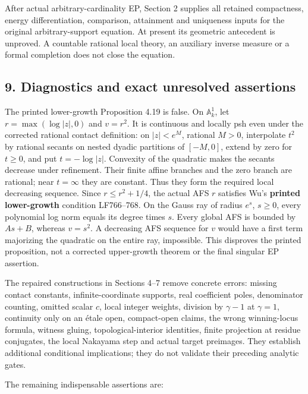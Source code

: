 \documentclass[
  10pt,
]{article}
\begin{document}
After actual arbitrary-cardinality EP, Section 2 supplies all retained
compactness, energy differentiation, comparison, attainment and
uniqueness inputs for the original arbitrary-support equation. At
present its geometric antecedent is unproved. A countable rational local
theory, an auxiliary inverse measure or a formal completion does not
close the equation.

\subsection{9. Diagnostics and exact unresolved
assertions}\label{diagnostics-and-exact-unresolved-assertions}

The printed lower-growth Proposition 4.19 is false. On
\(\mathbb A^1_k\), let \(r=\max(\log|z|,0)\) and \(v=r^2\). It is
continuous and locally psh even under the corrected rational contact
definition: on \(|z|<e^M\), rational \(M>0\), interpolate \(t^2\) by
rational secants on nested dyadic partitions of \([-M,0]\), extend by
zero for \(t\ge0\), and put \(t=-\log|z|\). Convexity of the quadratic
makes the secants decrease under refinement. Their finite affine
branches and the zero branch are rational; near \(t=\infty\) they are
constant. Thus they form the required local decreasing sequence. Since
\(r\le r^2+1/4\), the actual AFS \(r\) satisfies Wu's \textbf{printed
lower-growth} condition LF766--768. On the Gauss ray of radius \(e^s\),
\(s\ge0\), every polynomial log norm equals its degree times \(s\).
Every global AFS is bounded by \(As+B\), whereas \(v=s^2\). A decreasing
AFS sequence for \(v\) would have a first term majorizing the quadratic
on the entire ray, impossible. This disproves the printed proposition,
not a corrected upper-growth theorem or the final singular EP assertion.

The repaired constructions in Sections 4--7 remove concrete errors:
missing contact constants, infinite-coordinate supports, real
coefficient poles, denominator counting, omitted scalar \(c\), local
integer weights, division by \(\gamma-1\) at \(\gamma=1\), continuity
only on an étale open, compact-open claims, the wrong winning-locus
formula, witness gluing, topological-interior identities, finite
projection at residue conjugates, the local Nakayama step and actual
target preimages. They establish additional conditional implications;
they do not validate their preceding analytic gates.

The remaining indispensable assertions are:
\end{document}
